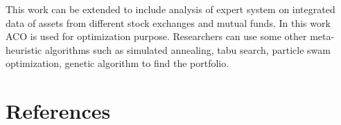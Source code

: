 \documentclass{ws-ijufks}
\begin{document}
This work can be extended to include analysis of expert system on integrated data of assets from different stock 
exchanges and mutual funds. In this work ACO is used for optimization purpose. Researchers can use some other 
meta-heuristic algorithms such as  simulated annealing, tabu search, particle swam optimization, genetic algorithm to 
find the portfolio.  

\section*{References}



\end{document}
